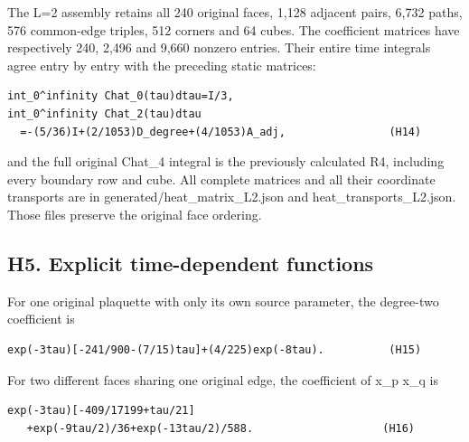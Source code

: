 \documentclass[11pt,a4paper]{article}
\renewcommand{\[}{\begingroup\small\originaldisplaystart}
\renewcommand{\]}{\originaldisplayend\endgroup}
\begin{document}
The L=2 assembly retains all 240 original faces, 1,128 adjacent pairs,
6,732 paths, 576 common-edge triples, 512 corners and 64 cubes. The
coefficient matrices have respectively 240, 2,496 and 9,660 nonzero
entries. Their entire time integrals agree entry by entry with the
preceding static matrices:

\begin{verbatim}
int_0^infinity Chat_0(tau)dtau=I/3,
int_0^infinity Chat_2(tau)dtau
  =-(5/36)I+(2/1053)D_degree+(4/1053)A_adj,                (H14)
\end{verbatim}

and the full original Chat\_4 integral is the previously calculated R4,
including every boundary row and cube. All complete matrices and all
their coordinate transports are in
{g\allowbreak{}e\allowbreak{}n\allowbreak{}e\allowbreak{}r\allowbreak{}a\allowbreak{}t\allowbreak{}e\allowbreak{}d\allowbreak{}/\allowbreak{}h\allowbreak{}e\allowbreak{}a\allowbreak{}t\allowbreak{}\_\allowbreak{}m\allowbreak{}a\allowbreak{}t\allowbreak{}r\allowbreak{}i\allowbreak{}x\allowbreak{}\_\allowbreak{}L\allowbreak{}2\allowbreak{}.\allowbreak{}j\allowbreak{}s\allowbreak{}o\allowbreak{}n\allowbreak{}}
and
{h\allowbreak{}e\allowbreak{}a\allowbreak{}t\allowbreak{}\_\allowbreak{}t\allowbreak{}r\allowbreak{}a\allowbreak{}n\allowbreak{}s\allowbreak{}p\allowbreak{}o\allowbreak{}r\allowbreak{}t\allowbreak{}s\allowbreak{}\_\allowbreak{}L\allowbreak{}2\allowbreak{}.\allowbreak{}j\allowbreak{}s\allowbreak{}o\allowbreak{}n\allowbreak{}.\allowbreak{}}
Those files preserve the original face ordering.

\subsection{H5. Explicit time-dependent
functions}\label{h5.-explicit-time-dependent-functions}

For one original plaquette with only its own source parameter, the
degree-two coefficient is

\begin{verbatim}
exp(-3tau)[-241/900-(7/15)tau]+(4/225)exp(-8tau).          (H15)
\end{verbatim}

For two different faces sharing one original edge, the coefficient of
x\_p x\_q is

\begin{verbatim}
exp(-3tau)[-409/17199+tau/21]
   +exp(-9tau/2)/36+exp(-13tau/2)/588.                    (H16)
\end{verbatim}
\end{document}
